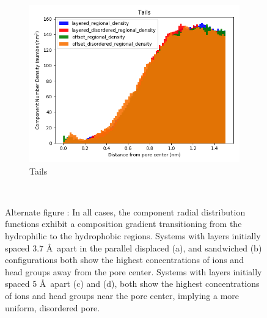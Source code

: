 \documentclass[journal=jpcbfk,manusciprt=article]{achemso}
\begin{document}
\begin{figure}
\begin{subfigure}{0.32\textwidth}
        \includegraphics[width=1\linewidth]{tails_density.png}
        \caption{Tails}
        \label{fig:tails_regional_density}
  \end{subfigure}
  \caption{Alternate figure : In all cases, the component radial distribution functions exhibit a
	  composition gradient transitioning from the hydrophilic to the hydrophobic
	  regions. Systems with layers initially spaced 3.7 \AA~apart in the  parallel
	  displaced (a), and sandwiched (b) configurations both show the highest
	  concentrations of ions and head groups away from the pore center. Systems with
	  layers initially spaced 5 \AA~apart (c) and (d), both show the highest
	  concentrations of ions and head groups near the pore center, implying a more
	  uniform, disordered pore.}~\label{fig:overlaid_densities}
  \end{figure}
  
\end{document}
